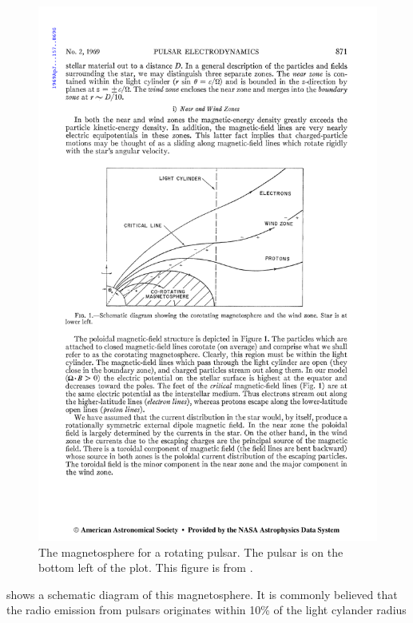 \begin{figure}[htbp]
  \centering
    \includegraphics{chapters/pulsar_pwn_system/figures/pulsar_magnetosphere.pdf}
  \caption{The magnetosphere for a rotating pulsar.
  The pulsar is on the bottom left of the plot. This figure is
  from \cite{goldreich_1969_pulsar-electrodynamics}.}
\end{figure}

 shows a schematic diagram of this
magnetosphere. It is commonly believed that the radio emission
from pulsars originates within 10\% of the light cylander radius
\citep[see][and references therein]{kijak_2003a_radio-emission}

